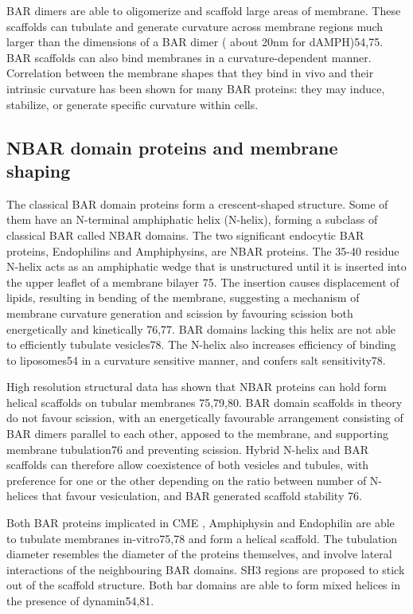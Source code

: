 \vspace{5mm}
BAR dimers are able to oligomerize and scaffold large areas of membrane. These scaffolds can tubulate and generate curvature across membrane regions much larger than the dimensions of a BAR dimer ( about 20nm for dAMPH)54,75. BAR scaffolds can also bind membranes in a curvature-dependent manner. Correlation between the membrane shapes that they bind in vivo and their intrinsic curvature has been shown for many BAR proteins: they may induce, stabilize, or generate specific curvature within cells. 


	\subsection{NBAR domain proteins and membrane shaping}	
	The classical BAR domain proteins form a crescent-shaped structure. Some of them have an N-terminal amphiphatic helix (N-helix), forming a subclass of classical BAR called NBAR domains. The two significant endocytic BAR proteins, Endophilins and Amphiphysins, are NBAR proteins. The 35-40 residue N-helix acts as an amphiphatic wedge that is unstructured until it is inserted into the upper leaflet of a membrane bilayer 75. The insertion causes displacement of lipids, resulting in bending of the membrane, suggesting a mechanism of membrane curvature generation and scission by favouring scission both energetically and kinetically 76,77. BAR domains lacking this helix are not able to efficiently tubulate vesicles78. The N-helix also increases efficiency of binding to liposomes54 in a curvature sensitive manner, and confers salt sensitivity78. 

	\vspace{5mm}
	High resolution structural data has shown that NBAR proteins can hold form helical scaffolds on tubular membranes 75,79,80. BAR domain scaffolds in theory do not favour scission, with an energetically favourable arrangement consisting of BAR dimers parallel to each other, apposed to the membrane, and supporting membrane tubulation76 and preventing scission. Hybrid N-helix and BAR scaffolds can therefore allow coexistence of both vesicles and tubules, with preference for one or the other depending on the ratio between number of N-helices that favour vesiculation, and BAR generated scaffold stability 76. 

	\vspace{5mm}
	Both BAR proteins implicated in CME , Amphiphysin and Endophilin are able to tubulate membranes in-vitro75,78 and form a helical scaffold. The tubulation diameter resembles the diameter of the proteins themselves, and involve lateral interactions of the neighbouring BAR domains. SH3 regions are proposed to stick out of the scaffold structure. Both bar domains are able to form mixed helices in the presence of dynamin54,81. 

